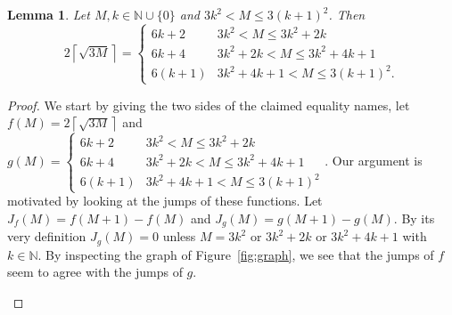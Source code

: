 \documentclass[11pt]{amsart}
\newtheorem{lemma}[theorem]{Lemma}
\theoremstyle{remark}
\newcommand{\M}{\mathcal{M}}
\newcommand{\N}{\mathbb{N}}
\newcommand{\ceil}[1]{\left\lceil #1 \right\rceil}
\newcommand{\chris}[1]{\textcolor{purple}{[Chris] #1}}
\newcommand{\David}[1]{\textcolor{red}{[David] #1}}
\begin{document}
\begin{lemma}\label{lem:casewise}
   Let $M,k\in\mathbb{N}\cup\{0\}$ and $3k^2<M\leq3(k+1)^2$.  Then  $$2\ceil{\sqrt{3M}}=\begin{cases}
    6k+2 & 3k^2<M\leq 3k^2+2k \\
    6k+4 & 3k^2+2k<M\leq 3k^2+4k+1 \\
    6(k+1) & 3k^2+4k+1<M\leq 3(k+1)^2.
\end{cases}$$
\end{lemma}
\begin{proof}
We start by giving the two sides of the claimed equality names, let $f(M)=2\ceil{\sqrt{3M}}$ and 
\\
$g(M)=\begin{cases}
    6k+2 & 3k^2<M\leq 3k^2+2k \\
    6k+4 & 3k^2+2k<M\leq 3k^2+4k+1 \\
    6(k+1) & 3k^2+4k+1<M\leq 3(k+1)^2
\end{cases}$.  Our argument is motivated by looking at the jumps of these functions. Let $J_f(M)=f(M+1)-f(M)$ and $J_g(M)=g(M+1)-g(M)$.  By its very definition $J_g(M)=0$ unless $M=3k^2$ or $3k^2+2k$ or $3k^2+4k+1$ with $k\in \N$.  By inspecting the graph of Figure~\ref{fig:graph}, we see that the jumps of $f$ seem to agree with the jumps of $g$.%


\begin{figure}[htb]
\end{figure}
\end{proof}
\end{document}
